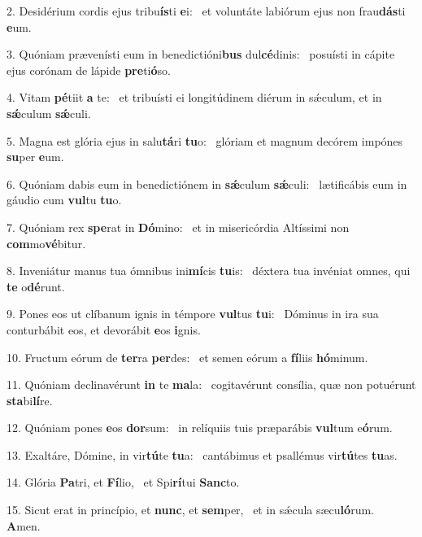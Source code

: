 2. Desidérium cordis ejus tribu\textbf{ís}ti \textbf{e}i: \ast\  et voluntáte labiórum ejus non frau\textbf{dás}ti \textbf{e}um.\

3. Quóniam prævenísti eum in benedictióni\textbf{bus} dul\textbf{cé}dinis: \ast\  posuísti in cápite ejus corónam de lápide \textbf{pre}ti\textbf{ó}so.\

4. Vitam \textbf{pé}tiit \textbf{a} te: \ast\  et tribuísti ei longitúdinem diérum in sǽculum, et in \textbf{sǽ}culum \textbf{sǽ}culi.\

5. Magna est glória ejus in salu\textbf{tá}ri \textbf{tu}o: \ast\  glóriam et magnum decórem impónes \textbf{su}per \textbf{e}um.\

6. Quóniam dabis eum in benedictiónem in \textbf{sǽ}culum \textbf{sǽ}culi: \ast\  lætificábis eum in gáudio cum \textbf{vul}tu \textbf{tu}o.\

7. Quóniam rex \textbf{spe}rat in \textbf{Dó}mino: \ast\  et in misericórdia Altíssimi non \textbf{com}mo\textbf{vé}bitur.\

8. Inveniátur manus tua ómnibus ini\textbf{mí}cis \textbf{tu}is: \ast\  déxtera tua invéniat omnes, qui \textbf{te} o\textbf{dé}runt.\

9. Pones eos ut clíbanum ignis in témpore \textbf{vul}tus \textbf{tu}i: \ast\  Dóminus in ira sua conturbábit eos, et devorábit \textbf{e}os \textbf{i}gnis.\

10. Fructum eórum de \textbf{ter}ra \textbf{per}des: \ast\  et semen eórum a \textbf{fí}liis \textbf{hó}minum.\

11. Quóniam declinavérunt \textbf{in} te \textbf{ma}la: \ast\  cogitavérunt consília, quæ non potuérunt \textbf{sta}bi\textbf{lí}re.\

12. Quóniam pones \textbf{e}os \textbf{dor}sum: \ast\  in relíquiis tuis præparábis \textbf{vul}tum e\textbf{ó}rum.\

13. Exaltáre, Dómine, in vir\textbf{tú}te \textbf{tu}a: \ast\  cantábimus et psallémus vir\textbf{tú}tes \textbf{tu}as.\

14. Glória \textbf{Pa}tri, et \textbf{Fí}lio, \ast\  et Spi\textbf{rí}tui \textbf{Sanc}to.\

15. Sicut erat in princípio, et \textbf{nunc}, et \textbf{sem}per, \ast\  et in sǽcula sæcu\textbf{ló}rum. \textbf{A}men.\

